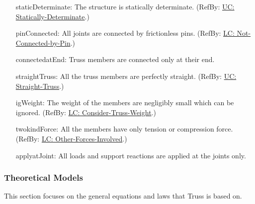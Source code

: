 \documentclass[12pt]{article}
\begin{document}
\begin{itemize}
\item[staticDeterminate:\phantomsection\label{staticDeterminate}]{The  structure is statically determinate. (RefBy: \hyperref[unlikeChgStatD]{UC: Statically-Determinate}.)}
\item[pinConnected:\phantomsection\label{pinConnected}]{All joints are connected by frictionless pins. (RefBy: \hyperref[likeChgNCbP]{LC: Not-Connected-by-Pin}.)}
\item[connectedatEnd:\phantomsection\label{connectedatEnd}]{Truss members are connected only at their end.}
\item[straightTruss:\phantomsection\label{straightTruss}]{All the truss members are perfectly straight. (RefBy: \hyperref[unlikeChgST]{UC: Straight-Truss}.)}
\item[igWeight:\phantomsection\label{igWeight}]{The weight of the members are negligibly small which can be ignored. (RefBy: \hyperref[likeChgWoT]{LC: Consider-Truss-Weight}.)}
\item[twokindForce:\phantomsection\label{twokindForce}]{All the members have only tension or compression force. (RefBy: \hyperref[likeChgOtherF]{LC: Other-Forces-Involved}.)}
\item[applyatJoint:\phantomsection\label{applyatJoint}]{All loads and support reactions are applied at the joints only.}
\end{itemize}
\subsubsection{Theoretical Models}
\label{Sec:TMs}
This section focuses on the general equations and laws that Truss is based on.
\end{document}
